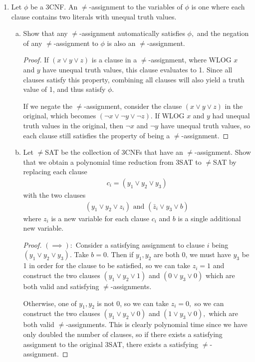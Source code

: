 \documentclass{article}
\begin{document}
\begin{enumerate}
	\item Let $\phi$ be a 3CNF. An $\neq$-assignment to the variables of $\phi$ is one where each clause contains two literals with unequal truth values.
		\begin{enumerate}[(a)]
			\item Show that any $\neq$-assignment automatically satisfies $\phi,$ and the negation of any $\neq$-assignment to $\phi$ is also an $\neq$-assignment.
				\begin{proof}
					If $(x\vee y\vee z)$ is a clause in a $\neq$-assignment, where WLOG $x$ and $y$ have unequal truth values, this clause evaluates to 1. Since all clauses satisfy this property, combining all clauses will also yield a truth value of 1, and thus satisfy $\phi.$

					If we negate the $\neq$-assignment, consider the clause $(x\vee y\vee z)$ in the original, which becomes $(\neg x\vee\neg y\vee\neg z).$ If WLOG $x$ and $y$ had unequal truth values in the original, then $\neg x$ and $\neg y$ have unequal truth values, so each clause still satisfies the property of being a $\neq$-assignment.
				\end{proof}

			\item Let $\neq$SAT be the collection of 3CNFs that have an $\neq$-assignment. Show that we obtain a polynomial time reduction from 3SAT to $\neq$SAT by replacing each clause
				\begin{align*}
					c_i=\left( y_1\vee y_2\vee y_3 \right)
				\end{align*}
				with the two clauses
				\begin{align*}
					\left( y_1\vee y_2\vee z_i \right)\text{ and } \left(\bar z_i\vee y_3\vee b\right)
				\end{align*}
				where $z_i$ is a new variable for each clause $c_i$ and $b$ is a single additional new variable.
				\begin{proof}
					$(\implies):$ Consider a satisfying assignment to clause $i$ being $(y_1\vee y_2\vee y_3).$ Take $b=0.$ Then if $y_1, y_2$ are both 0, we must have $y_3$ be 1 in order for the clause to be satisfied, so we can take $z_i=1$ and construct the two clauses $(y_1\vee y_2\vee 1)$ and $(0\vee y_3\vee 0)$ which are both valid and satisfying $\neq$-assignments. 
					
					Otherwise, one of $y_1, y_2$ is not 0, so we can take $z_i=0,$ so we can construct the two clauses $(y_1\vee y_2\vee 0)$ and $(1\vee y_3\vee 0),$ which are both valid $\neq$-assignments. This is clearly polynomial time since we have only doubled the number of clauses, so if there exists a satisfying assignment to the original 3SAT, there exists a satisfying $\neq$-assignment.


\end{proof}
\end{enumerate}
\end{enumerate}
\end{document}
